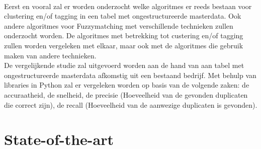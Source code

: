 \\\indent
Eerst en vooral zal er worden onderzocht welke algoritmes er reeds bestaan voor clustering en/of tagging in een tabel met ongestructureerde masterdata. Ook andere algoritmes voor Fuzzymatching met verschillende technieken zullen onderzocht worden. De algoritmes met betrekking tot custering en/of tagging zullen worden vergeleken met elkaar, maar ook met de algoritmes die gebruik maken van andere technieken.
\\\indent
De vergelijkende studie zal uitgevoerd worden aan de hand van aan tabel met ongestructureerde masterdata afkomstig uit een bestaand bedrijf. Met behulp van libraries in Python zal er vergeleken worden op basis van de volgende zaken: de accuraatheid, de snelheid, de precisie (Hoeveelheid van de gevonden duplicaten die correct zijn), de recall (Hoeveelheid van de aanwezige duplicaten is gevonden).


\section{State-of-the-art}%
\label{sec:state-of-the-art}


